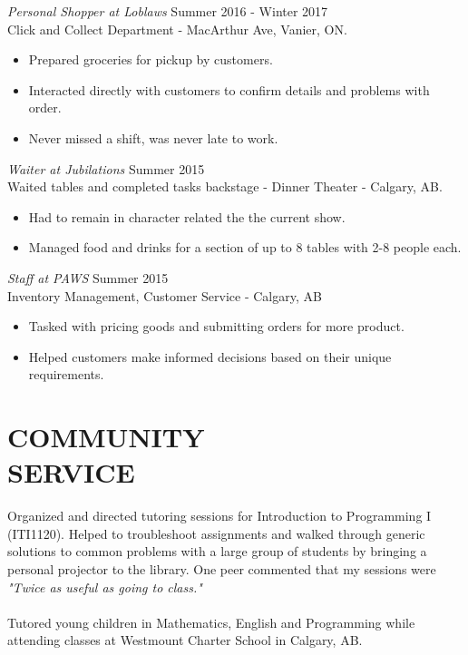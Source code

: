 \documentclass[margin]{res}
\begin{document}
\begin{resume}
 
 
                {\sl Personal Shopper at Loblaws} \hfill            Summer 2016 - Winter 2017 \\
                Click and Collect Department - MacArthur Ave, Vanier, ON.
                 \begin{itemize}  \itemsep -2pt %
                 \item Prepared groceries for pickup by customers.
                 \item Interacted directly with customers to confirm details and problems with order.
                 \item Never missed a shift, was never late to work.
                 \end{itemize} 
                 
                {\sl Waiter at Jubilations} \hfill        Summer 2015 \\
               	Waited tables and completed tasks backstage - Dinner Theater - Calgary, AB.
\begin{itemize}  \itemsep -2pt %
                 \item Had to remain in character related the the current show.
                 \item Managed food and drinks for a section of up to 8 tables with 2-8 people each.
                 \end{itemize} 
                   
                {\sl Staff at PAWS} \hfill        Summer 2015 \\
Inventory Management, Customer Service - Calgary, AB      
\begin{itemize}  \itemsep -2pt %
                 \item Tasked with pricing goods and submitting orders for more product.
                 \item Helped customers make informed decisions based on their unique requirements.
                 \end{itemize}          	

 \section{COMMUNITY \\ SERVICE}  Organized and directed tutoring sessions for Introduction to Programming I (ITI1120). Helped to troubleshoot assignments and walked through generic solutions to common problems with a large group of students by bringing a personal projector to the library. One peer commented that my sessions were {\sl "Twice as useful as going to class."}\\
\\Tutored young children in Mathematics, English and Programming while attending classes at Westmount Charter School in Calgary, AB.\\



\end{resume}
\end{document}

